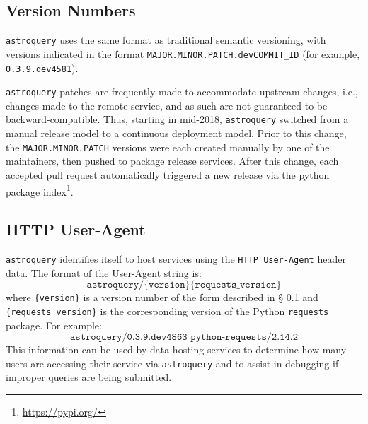 \documentclass[twocolumn]{aastex62}
\newcommand{\package}[1]{\texttt{#1}\xspace}
\newcommand{\astroquery}{\package{astroquery}}
\newcommand{\astropypkg}{\package{astropy}}
\begin{document}
\subsection{Version Numbers}
\label{sec:versionnumbers}
\astroquery uses the same format as traditional semantic versioning,
with versions indicated in the format \texttt{MAJOR.MINOR.PATCH.devCOMMIT\_ID} (for
example, \texttt{0.3.9.dev4581}).

\astroquery patches are frequently made to accommodate upstream changes, i.e.,
changes made to the remote service, and as such are not guaranteed to be
backward-compatible. Thus, starting in mid-2018, \astroquery switched from a manual release model to a
continuous deployment model.  Prior to this change, the
\texttt{MAJOR.MINOR.PATCH} versions were each created manually by one of the
maintainers, then pushed to package release services.  After this change, each
accepted pull request automatically triggered a new release via the python
package index\footnote{\url{https://pypi.org/}}.


%

\subsection{HTTP User-Agent}
\label{sec:useragent}
\astroquery identifies itself to host services using the \texttt{HTTP
User-Agent} header data.  The format of the User-Agent string is:
\[\texttt{astroquery/\{version\} \{requests\_version\}}\] where
\texttt{\{version\}} is a version number of the form described in \S
\ref{sec:versionnumbers} and \texttt{\{requests\_version\}} is the
corresponding version of the Python \package{requests} package. For example:
\[\texttt{astroquery/0.3.9.dev4863 python-requests/2.14.2}\]
This information
can be used by data hosting services to determine how many users are accessing
their service via \astroquery and to assist in debugging if improper queries
are being submitted.
\end{document}
